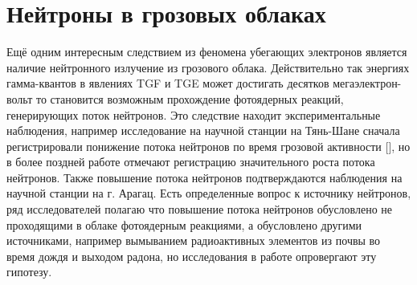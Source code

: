 
\section{Нейтроны в грозовых облаках}\label{sec:thunderstorm/neutron} 

Ещё одним интересным следствием из феномена убегающих электронов является наличие нейтронного излучение из грозового облака. Действительно так энергиях гамма-квантов в явлениях TGF и TGE может достигать десятков мегаэлектрон-вольт то становится возможным прохождение фотоядерных реакций, генерирующих поток нейтронов. Это следствие находит экспериментальные наблюдения, например исследование на научной станции на Тянь-Шане сначала регистрировали понижение потока нейтронов по время грозовой активности [], но в более поздней работе отмечают регистрацию значительного роста потока нейтронов. Также повышение потока нейтронов подтверждаются наблюдения на научной станции на г. Арагац. Есть определенные вопрос к источнику нейтронов, ряд исследователей полагаю что повышение потока нейтронов обусловлено не проходящими в облаке фотоядерным реакциями, а обусловлено другими источниками, например вымыванием радиоактивных элементов из почвы во время дождя и выходом радона, но исследования в работе опровергают эту гипотезу.


